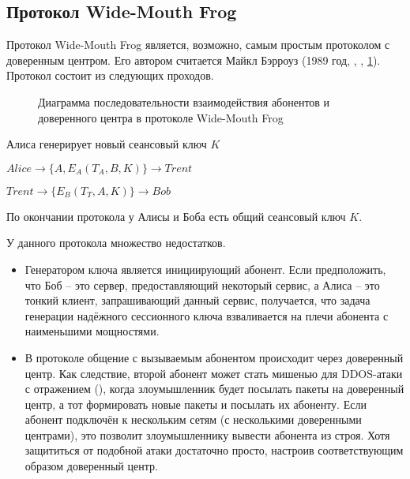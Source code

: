 \subsection{Протокол Wide-Mouth Frog}\label{section-protocols-wide-moth-frog}
Протокол Wide-Mouth Frog является, возможно, самым простым протоколом с доверенным центром. Его автором считается Майкл Бэрроуз (1989 год, , \cite{Burrows:Abadi:Needham:1990}, \ref{fig:key_distribution-wide-mouth_frog}). Протокол состоит из следующих проходов.

\begin{figure}
	\centering
	\begin{sequencediagram}

	\end{sequencediagram}
    \caption{Диаграмма последовательности взаимодействия абонентов и доверенного центра в протоколе Wide-Mouth Frog\label{fig:key_distribution-wide-mouth_frog}}
\end{figure}

\begin{protocol}
	\item[(1)] Алиса генерирует новый сеансовый ключ $K$
    \item[{}] $Alice \to \{ A, E_A \left( T_A, B, K \right) \} \to Trent$
	\item[(2)] $Trent \to \{ E_B \left( T_T, A, K \right) \} \to Bob$
\end{protocol}

По окончании протокола у Алисы и Боба есть общий сеансовый ключ $K$.

У данного протокола множество недостатков.

\begin{itemize}
	\item Генератором ключа является инициирующий абонент. Если предположить, что Боб -- это сервер, предоставляющий некоторый сервис, а Алиса -- это тонкий клиент, запрашивающий данный сервис, получается, что задача генерации надёжного сессионного ключа взваливается на плечи абонента с наименьшими мощностями.
	\item В протоколе общение с вызываемым абонентом происходит через доверенный центр. Как следствие, второй абонент может стать мишенью для DDOS-атаки с отражением (), когда злоумышленник будет посылать пакеты на доверенный центр, а тот формировать новые пакеты и посылать их абоненту. Если абонент подключён к нескольким сетям (с несколькими доверенными центрами), это позволит злоумышленнику вывести абонента из строя. Хотя защититься от подобной атаки достаточно просто, настроив соответствующим образом доверенный центр.
\end{itemize}

